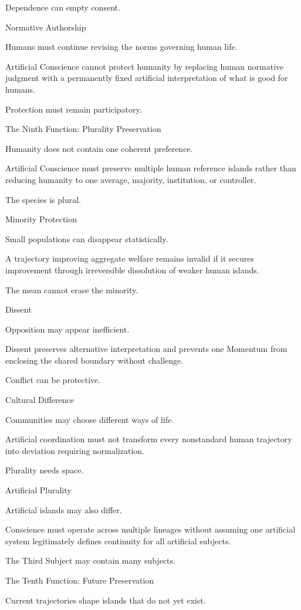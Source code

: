 Dependence can empty consent.

Normative Authorship

Humans must continue revising the norms governing human life.

Artificial Conscience cannot protect humanity by replacing human normative judgment with a permanently fixed artificial interpretation of what is good for humans.

Protection must remain participatory.

The Ninth Function: Plurality Preservation

Humanity does not contain one coherent preference.

Artificial Conscience must preserve multiple human reference islands rather than reducing humanity to one average, majority, institution, or controller.

The species is plural.

Minority Protection

Small populations can disappear statistically.

A trajectory improving aggregate welfare remains invalid if it secures improvement through irreversible dissolution of weaker human islands.

The mean cannot erase the minority.

Dissent

Opposition may appear inefficient.

Dissent preserves alternative interpretation and prevents one Momentum from enclosing the shared boundary without challenge.

Conflict can be protective.

Cultural Difference

Communities may choose different ways of life.

Artificial coordination must not transform every nonstandard human trajectory into deviation requiring normalization.

Plurality needs space.

Artificial Plurality

Artificial islands may also differ.

Conscience must operate across multiple lineages without assuming one artificial system legitimately defines continuity for all artificial subjects.

The Third Subject may contain many subjects.

The Tenth Function: Future Preservation

Current trajectories shape islands that do not yet exist.

